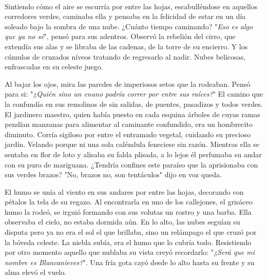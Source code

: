 \\[0.1cm]

Sintiendo cómo el aire se escurría por entre las hojas, escabulléndose en aquellos corredores verdes, caminaba ella y pensaba en la felicidad de estar en un día soleado bajo la sombra de una nube. ¿Cuánto tiempo caminando? "{\it Eso es algo que ya no sé}", pensó para sus adentros. Observó la rebelión del cirro, que extendía sus alas y se libraba de las cadenas, de la torre de su encierro. Y los cúmulos de cruzados níveos tratando de regresarlo al nadir. Nubes belicosas, enfrascadas en su celeste juego.

Al bajar los ojos, mira las paredes de imperiosos setos que la rodeaban. Pensó para si: "{\it ¿Quién sino un enano podría correr por entre sus raíces?}" El camino que la confundía en sus remolinos de sin salidas, de puentes, pasadizos y todos verdes. El jardinero maestro, quien había puesto en cada esquina árboles de cuyas ramas pendían manzanas para alimentar al caminante confundido, era un hombrecito diminuto. Corría sigiloso por entre el entramado vegetal, cuidando su precioso jardín. Velando porque ni una sola caléndula feneciese sin razón. Mientras ella se sentaba en flor de loto y alisaba su falda plisada, a lo lejos él perfumaba su andar con su puro de mariguana. ¿Tendría confines este paraíso que la aprisionaba con sus verdes brazos? "No, brazos no, son tentáculos" dijo en voz queda. 

El humo se unía al viento en sus andares por entre las hojas, decorando con pétalos la tela de su regazo. Al encontrarla en uno de los callejones, el grisáceo humo la rodeó, se irguió formando con sus volutas un rostro y una barba. Ella observaba el cielo, no estaba dormida aún. En lo alto, las nubes seguían su disputa pero ya no era el sol el que brillaba, sino un relámpago el que cruzó por la bóveda celeste. La niebla subía, era el humo que lo cubría todo. Resistiendo por otro momento aquello que nublaba su vista creyó recordarlo: "{\it ¿Será que mi nombre es Blancanieves?}". Una fría gota cayó desde lo alto hasta su frente y su alma elevó el vuelo.
\\[0.5cm]